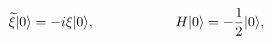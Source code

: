 \begin{equation}
\label{keyrelation}
{\widetilde \xi}|0 \rangle = -i\xi|0 \rangle, \hspace{0.8in} 
H|0 \rangle = -\frac{1}{2}|0 \rangle,
\end{equation}

